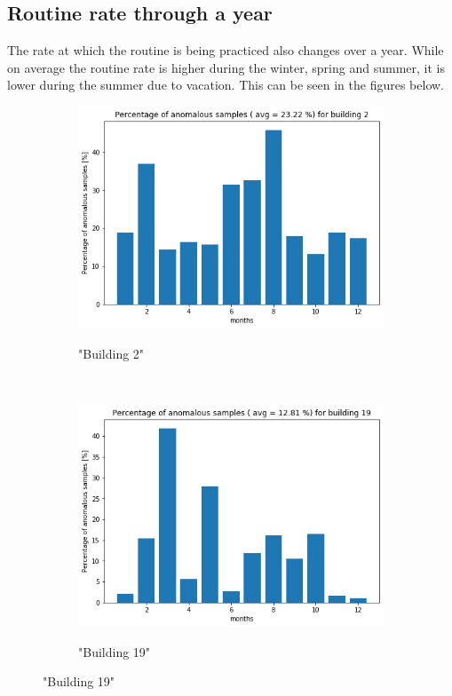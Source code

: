 \subsection{Routine rate through a year}

The rate at which the routine is being practiced also changes over a year. 
While on average the routine rate is higher during the winter, spring and summer, it is lower during the summer due to vacation. 
This can be seen in the figures below. 

\begin{figure}[H]
	\begin{subfigure}{.5\textwidth}
		\caption{"Building 2"}
		\includegraphics[width=1\linewidth]{../Figures/EC/b2year.png}
		\label{fig:ec_b2year}
	\end{subfigure}%
	~ 
	\begin{subfigure}{.5\textwidth}
		\caption{"Building 19"}
		\includegraphics[width=1\linewidth]{../Figures/EC/b19year.png}
		\label{fig:ec_b5year}
	\end{subfigure}%
    \bigskip


\end{figure}
